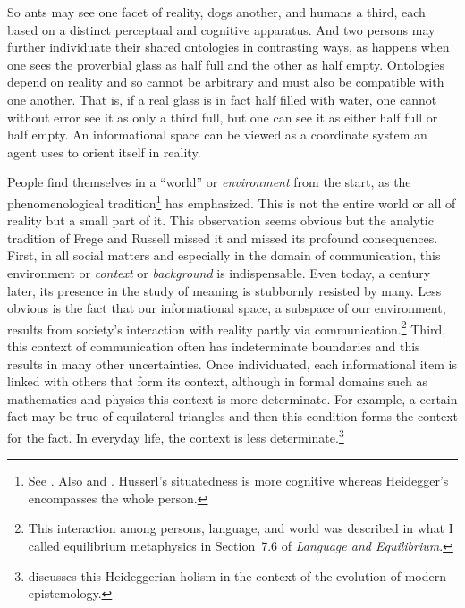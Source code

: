 So ants may see one facet of reality, dogs another, and humans a third, each based on a distinct perceptual and cognitive apparatus. And two persons may further individuate their shared ontologies in contrasting ways, as happens when one sees the proverbial glass as half full and the other as half empty. Ontologies depend on reality and so cannot be arbitrary and must also be compatible with one another. That is, if a real glass is in fact half filled with water, one cannot without error see it as only a third full, but one can see it as either half full or half empty. An informational space can be viewed as a coordinate system an agent uses to orient itself in reality. 

People find themselves in a ``world'' or \emph{environment} from the start, as the phenomenological tradition\footnote{See \citet{spiegelberg:pm}. Also \citet[68--71]{husserl:tns} and \citet[Division One]{heidegger:bt}. Husserl's situatedness is more cognitive whereas Heidegger's encompasses the whole person.} has emphasized. This is not the entire world or all of reality but a small part of it. This observation seems obvious but the analytic tradition of Frege and Russell missed it and missed its profound consequences. First, in all social matters and especially in the domain of communication, this environment or \emph{context} or \emph{background} is indispensable. Even today, a century later, its presence in the study of meaning is stubbornly resisted by many. Less obvious is the fact that our informational space, a subspace of our environment, results from society's interaction with reality partly via communication.\footnote{This interaction among persons, language, and world was described in what I called equilibrium metaphysics in Section~7.6 of \emph{Language and Equilibrium}.} Third, this context of communication often has indeterminate boundaries and this results in many other uncertainties. Once individuated, each informational item is linked with others that form its context, although in formal domains such as mathematics and physics this context is more determinate. For example, a certain fact may be true of equilateral triangles and then this condition forms the context for the fact. In everyday life, the context is less determinate.\footnote{\citet[85--86]{taylor:rr} discusses this Heideggerian holism in the context of the evolution of modern epistemology.}\largerpage 

